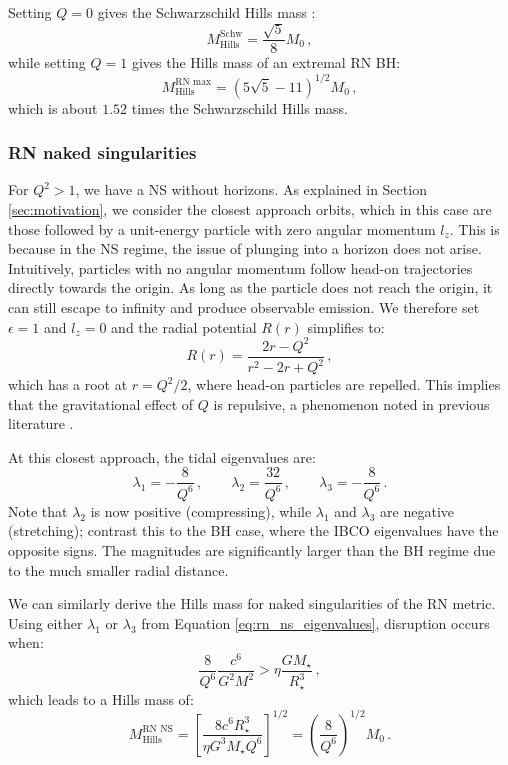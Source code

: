 \documentclass[
    reprint,
    prd,
    nofootinbib,
    amsmath,amssymb,
    aps,
    floatfix,
]{revtex4-2}
\begin{document}
Setting $Q = 0$ gives the Schwarzschild Hills mass \cite{Hills75, Kesden12, Mummery2023}:
\begin{equation}
    M_{\text{Hills}}^{\text{Schw}} = \frac{\sqrt{5}}{8} M_{0} \, ,
\end{equation}
while setting $Q = 1$ gives the Hills mass of an extremal RN BH:
\begin{equation}
    M_{\text{Hills}}^{\text{RN max}} = (5\sqrt{5} - 11)^{1/2} M_{0} \, ,
\end{equation}
which is about $1.52$ times the Schwarzschild Hills mass.


\subsubsection{RN naked singularities}


For $Q^{2} > 1$, we have a NS without horizons. As explained in Section \ref{sec:motivation}, we consider the closest approach orbits, which in this case are those followed by a unit-energy particle with zero angular momentum $l_{z}$. This is because in the NS regime, the issue of plunging into a horizon does not arise. Intuitively, particles with no angular momentum follow head-on trajectories directly towards the origin. As long as the particle does not reach the origin, it can still escape to infinity and produce observable emission. We therefore set $\epsilon = 1$ and $l_{z} = 0$ and the radial potential $R(r)$ simplifies to:
\begin{equation}
    R(r) = \frac{2r - Q^{2}}{r^{2} - 2r + Q^{2}} \, ,
\end{equation}
which has a root at $r = Q^{2}/2$, where head-on particles are repelled. This implies that the gravitational effect of $Q$ is repulsive, a phenomenon noted in previous literature \citep[e.g.,][]{Pugliese2011, Patil2012}.

At this closest approach, the tidal eigenvalues are:
\begin{equation}
    \lambda_{1} = -\frac{8}{Q^{6}} \, , \qquad \lambda_{2} = \frac{32}{Q^{6}} \, , \qquad \lambda_{3} = -\frac{8}{Q^{6}} \, .
    \label{eq:rn_ns_eigenvalues}
\end{equation}
Note that $\lambda_{2}$ is now positive (compressing), while $\lambda_{1}$ and $\lambda_{3}$ are negative (stretching); contrast this to the BH case, where the IBCO eigenvalues have the opposite signs. The magnitudes are significantly larger than the BH regime due to the much smaller radial distance.

We can similarly derive the Hills mass for naked singularities of the RN metric. Using either $\lambda_{1}$ or $\lambda_{3}$ from Equation \ref{eq:rn_ns_eigenvalues}, disruption occurs when:
\begin{equation}
    \frac{8}{Q^{6}} \frac{c^{6}}{G^{2} M^{2}} > \eta \frac{G M_{\star}}{R_{\star}^{3}} \, ,
\end{equation}
which leads to a Hills mass of:
\begin{equation}
    M_{\text{Hills}}^{\text{RN NS}} = \left[ \frac{8 c^{6} R_{\star}^{3}}{\eta G^{3} M_{\star} Q^{6}} \right]^{1/2} = \left( \frac{8}{Q^{6}} \right)^{1/2} M_{0} \, .
    \label{eq:rn_ns_hills_mass}
\end{equation}
\end{document}
